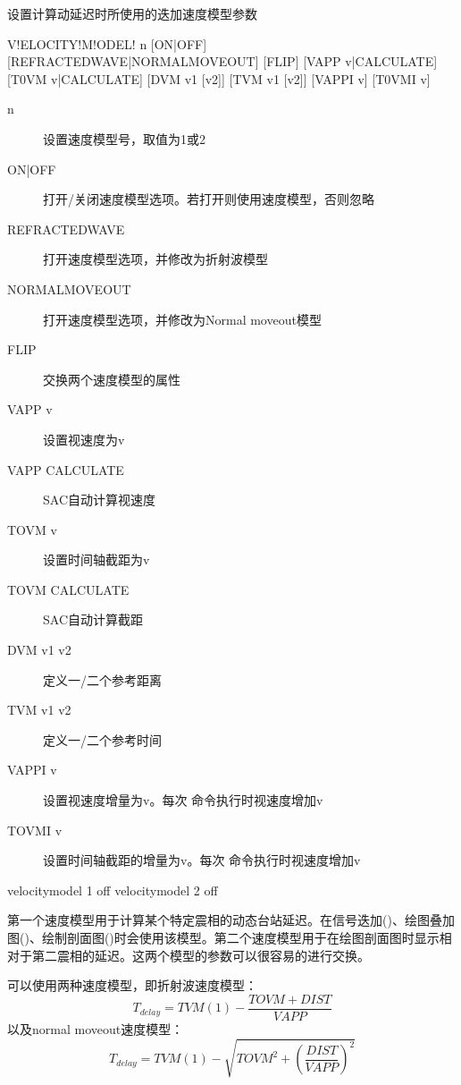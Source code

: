 \label{sss:velocitymodel}

设置计算动延迟时所使用的迭加速度模型参数

\begin{SACSTX}
V!ELOCITY!M!ODEL! n [ON|OFF] [REFRACTEDWAVE|NORMALMOVEOUT]
    [FLIP] [VAPP v|CALCULATE] [T0VM v|CALCULATE]
    [DVM v1 [v2]] [TVM v1 [v2]] [VAPPI v] [T0VMI v]
\end{SACSTX}

\begin{description}
\item [n] 设置速度模型号，取值为1或2
\item [ON|OFF] 打开/关闭速度模型选项。若打开则使用速度模型，否则忽略
\item [REFRACTEDWAVE] 打开速度模型选项，并修改为折射波模型
\item [NORMALMOVEOUT] 打开速度模型选项，并修改为Normal moveout模型
\item [FLIP] 交换两个速度模型的属性
\item [VAPP v] 设置视速度为v
\item [VAPP CALCULATE] SAC自动计算视速度
\item [TOVM v] 设置时间轴截距为v
\item [TOVM CALCULATE] SAC自动计算截距
\item [DVM v1 v2] 定义一/二个参考距离
\item [TVM v1 v2] 定义一/二个参考时间
\item [VAPPI v] 设置视速度增量为v。每次  命令执行时视速度增加v
\item [TOVMI v] 设置时间轴截距的增量为v。每次  命令执行时视速度增加v
\end{description}

\begin{SACDFT}
velocitymodel 1 off
velocitymodel 2 off
\end{SACDFT}

第一个速度模型用于计算某个特定震相的动态台站延迟。在信号迭加()、绘图叠加图()、绘制剖面图()时会使用该模型。第二个速度模型用于在绘图剖面图时显示相对于第二震相的延迟。这两个模型的参数可以很容易的进行交换。

可以使用两种速度模型，即折射波速度模型：
\[ T_{delay} = TVM(1) - \frac{TOVM+DIST}{VAPP} \]
以及normal moveout速度模型：
\[ T_{delay} = TVM(1) - \sqrt{TOVM^2 + (\frac{DIST}{VAPP})^2} \]

